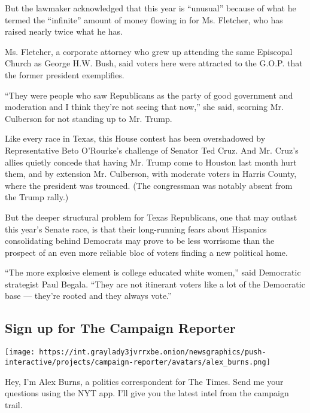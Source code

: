 But the lawmaker acknowledged that this year is ``unusual'' because of
what he termed the ``infinite'' amount of money flowing in for Ms.
Fletcher, who has raised nearly twice what he has.

Ms. Fletcher, a corporate attorney who grew up attending the same
Episcopal Church as George H.W. Bush, said voters here were attracted to
the G.O.P. that the former president exemplifies.

``They were people who saw Republicans as the party of good government
and moderation and I think they're not seeing that now,'' she said,
scorning Mr. Culberson for not standing up to Mr. Trump.

Like every race in Texas, this House contest has been overshadowed by
Representative Beto O'Rourke's challenge of Senator Ted Cruz. And Mr.
Cruz's allies quietly concede that having Mr. Trump come to Houston last
month hurt them, and by extension Mr. Culberson, with moderate voters in
Harris County, where the president was trounced. (The congressman was
notably absent from the Trump rally.)

But the deeper structural problem for Texas Republicans, one that may
outlast this year's Senate race, is that their long-running fears about
Hispanics consolidating behind Democrats may prove to be less worrisome
than the prospect of an even more reliable bloc of voters finding a new
political home.

``The more explosive element is college educated white women,'' said
Democratic strategist Paul Begala. ``They are not itinerant voters like
a lot of the Democratic base --- they're rooted and they always vote.''

\href{https://www.nytimes3xbfgragh.onion/interactive/2018/09/28/us/politics/the-campaign-reporter-ul.html?src=hpPromoHeadline}{}

\hypertarget{sign-up-for-the-campaign-reporter}{%
\subsection{Sign up for The Campaign
Reporter}\label{sign-up-for-the-campaign-reporter}}

\texttt{[image: https://int.graylady3jvrrxbe.onion/newsgraphics/push-interactive/projects/campaign-reporter/avatars/alex\_burns.png]}

Hey, I'm Alex Burns, a politics correspondent for The Times. Send me
your questions using the NYT app. I'll give you the latest intel from
the campaign trail.

